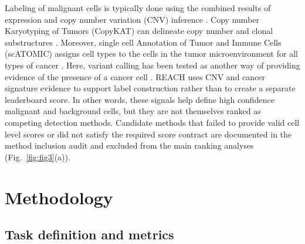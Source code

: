 \documentclass[10pt]{article}
\begin{document}
Labeling of malignant cells is typically done using the combined results of expression and copy number variation (CNV) inference \cite{gao2021delineating}. Copy number Karyotyping of Tumors (CopyKAT) can delineate copy number and clonal substructures \cite{gao2021delineating}. Moreover, single cell Annotation of Tumor and Immune Cells (scATOMIC) assigns cell types to the cells in the tumor microenvironment for all types of cancer \cite{nofech2023pan}. Here, variant calling has been tested as another way of providing evidence of the presence of a cancer cell \cite{gasper2022variant}. REACH uses CNV and cancer signature evidence to support label construction rather than to create a separate leaderboard score. In other words, these signals help define high confidence malignant and background cells, but they are not themselves ranked as competing detection methods. Candidate methods that failed to provide valid cell level scores or did not satisfy the required score contract are documented in the method inclusion audit and excluded from the main ranking analyses (Fig.~\ref{fig:fig3}(a)).

\section{Methodology}

\subsection{Task definition and metrics}
\end{document}
